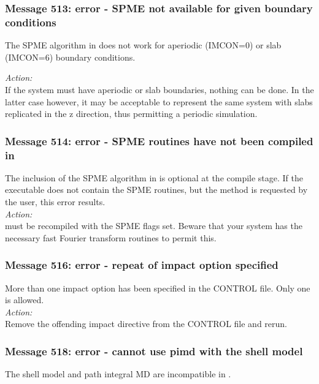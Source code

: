 \subsubsection*{Message 513: error - SPME not available for given
boundary conditions}

The SPME algorithm in \D{} does not work for aperiodic (IMCON=0) or slab
(IMCON=6) boundary conditions.

\noindent
{\em Action:}\\
If the system must have aperiodic or slab boundaries, nothing can be
done. In the latter case however, it may be acceptable to represent
the same system with slabs replicated in the z direction, thus
permitting a periodic simulation.

\subsubsection*{Message 514: error - SPME routines have not been
compiled in} 

The inclusion of the SPME algorithm in \D{} is optional at the compile
stage. If the executable does not contain the SPME routines, but the
method is requested by the user, this error results.\\

\noindent
{\em Action:}\\
\D{} must be recompiled with the SPME flags set. Beware that your system
has the necessary fast Fourier transform routines to permit this.

\subsubsection*{Message 516: error - repeat of impact option specified}

More than one impact option has been specified in the CONTROL
file. Only one is allowed.\\

\noindent
{\em Action:}\\
Remove the offending impact directive from the CONTROL file and rerun.

\subsubsection*{Message 518: error - cannot use pimd with the shell model}

The shell model and path integral MD are incompatible in \DD{}.\\

